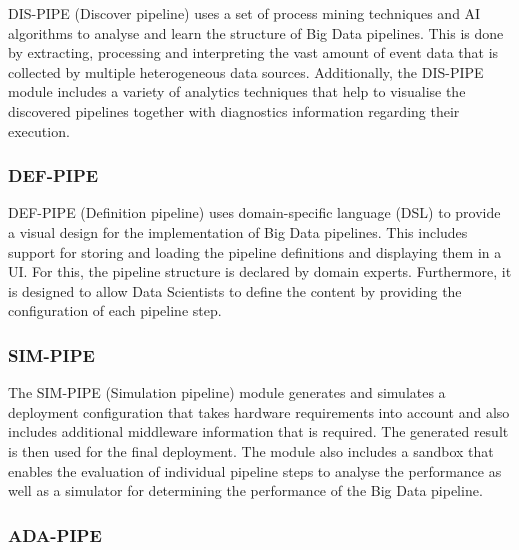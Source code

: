 \documentclass{article}
\begin{document}
                DIS-PIPE (Discover pipeline) \cite{agostinelliDISPIPE2023} uses a set of process mining techniques and AI algorithms to analyse and learn the structure of Big Data pipelines. This is done by extracting, processing and interpreting the vast amount of event data that is collected by multiple heterogeneous data sources. Additionally, the DIS-PIPE module includes a variety of analytics techniques that help to visualise the discovered pipelines together with diagnostics information regarding their execution. 

            \subsubsection*{DEF-PIPE}
            \label{sec:definition-pipe-datacloud}

                DEF-PIPE (Definition pipeline) \cite{mitrovicDEFPIPEFrontend2022} uses domain-specific language (DSL) \cite{jetbrainsWhatAreDomainSpecific} to provide a visual design for the implementation of Big Data pipelines.
                This includes support for storing and loading the pipeline definitions and displaying them in a UI. For this, the pipeline structure is declared by domain experts.
                Furthermore, it is designed to allow Data Scientists to define the content by providing the configuration of each pipeline step.

            \subsubsection*{SIM-PIPE}
            \label{sec:simulation-pipe-datacloud}

                The SIM-PIPE (Simulation pipeline) \cite{nikolovSIMPIPE} module generates and simulates a deployment configuration that takes hardware requirements into account and also includes additional middleware information that is required. The generated result is then used for the final deployment.
                The module also includes a sandbox that enables the evaluation of individual pipeline steps to analyse the performance as well as a simulator for determining the performance of the Big Data pipeline.
                
            \subsubsection*{ADA-PIPE}
            \label{sec:adaptation-pipe-datacloud}
\end{document}
